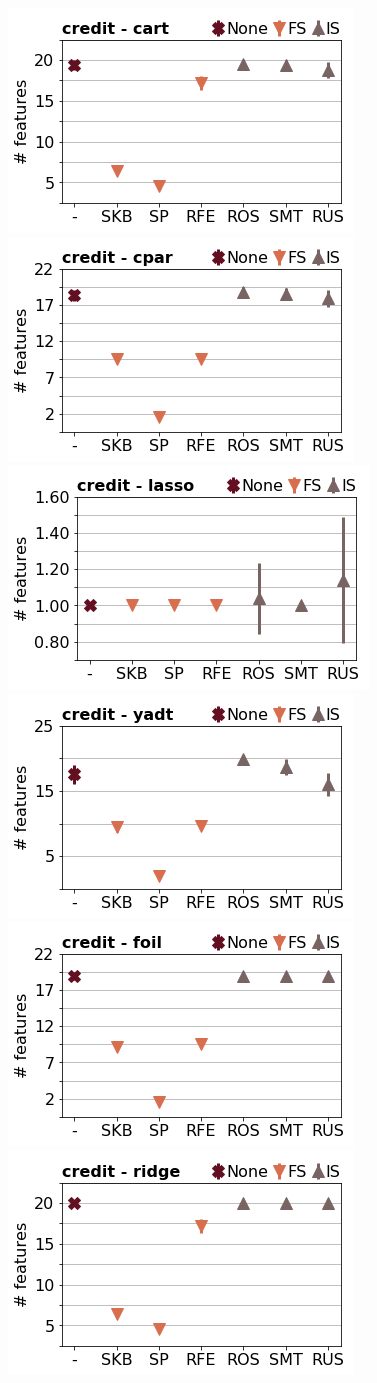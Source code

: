 \documentclass[runningheads,a4paper]{llncs}
\begin{document}
\begin{figure}[!h]
\includegraphics[width=0.32\linewidth]{fig/preps_credit_DT_sklearn_nbr_features.png}
\includegraphics[width=0.32\linewidth]{fig/preps_credit_RB_cpar_nbr_features.png}
\includegraphics[width=0.32\linewidth]{fig/preps_credit_LM_lasso_nbr_features.png}
\includegraphics[width=0.32\linewidth]{fig/preps_credit_DT_yadt_nbr_features.png}
\includegraphics[width=0.32\linewidth]{fig/preps_credit_RB_foil_nbr_features.png}
\includegraphics[width=0.32\linewidth]{fig/preps_credit_LM_ridge_nbr_features.png}
\end{figure}
\end{document}
